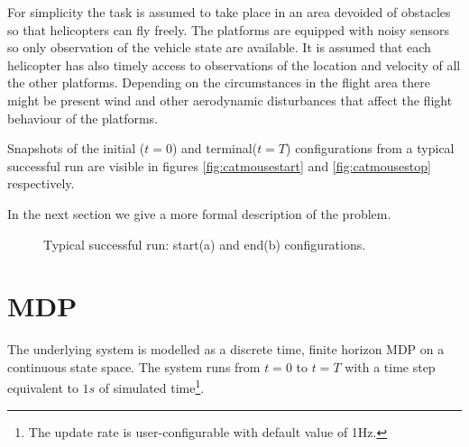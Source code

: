 \documentclass[a4paper,11pt]{report}
\begin{document}
For simplicity the task is assumed to take place in an area devoided of obstacles so that helicopters can fly freely. The platforms are equipped with noisy sensors so only observation of the vehicle state are available.  
It is assumed that each helicopter has also timely access to observations of the location and velocity of all the other platforms. 
Depending on the circumstances in the flight area there might be present wind and other aerodynamic disturbances that affect the flight behaviour of the platforms.

Snapshots of the initial ($t=0$) and terminal($t=T$) configurations from a typical successful run are visible in figures \ref{fig:catmousestart} and \ref{fig:catmousestop} respectively. 

In the next section we give a more formal description of the problem.

\begin{figure}[h]
\centering
{}
\caption{Typical successful run: start(a) and end(b) configurations. \label{fig:catmouse}}
\end{figure}

\section{MDP}

The underlying system is modelled as a discrete time, finite horizon MDP on a continuous state space. The system runs from $t=0$ to $t=T$ with a time step equivalent to $1s$ of simulated time\footnote{The update rate is user-configurable with default value of 1Hz.}. 
\end{document}
